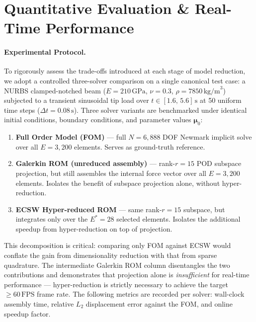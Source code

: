 \newpage

\section{Quantitative Evaluation \& Real-Time Performance}
\label{sec:benchmarks}


\paragraph{Experimental Protocol.}
To rigorously assess the trade-offs introduced at each stage of model reduction, we adopt a controlled three-solver comparison on a single canonical test case: a NURBS clamped-notched beam ($E = 210\,\text{GPa}$, $\nu = 0.3$, $\rho = 7850\,\text{kg/m}^3$) subjected to a transient sinusoidal tip load over $t \in [1.6,\, 5.6]\,\text{s}$ at 50 uniform time steps ($\Delta t = 0.08\,\text{s}$).
Three solver variants are benchmarked under identical initial conditions, boundary conditions, and parameter values $\boldsymbol{\mu}_0$:
\begin{enumerate}[noitemsep, leftmargin=1.5em]
    \item \textbf{Full Order Model (FOM)} — full $N = 6{,}888$ DOF Newmark implicit solve over all $E = 3{,}200$ elements. Serves as ground-truth reference.
    \item \textbf{Galerkin ROM (unreduced assembly)} — rank-$r = 15$ POD subspace projection, but still assembles the internal force vector over all $E = 3{,}200$ elements. Isolates the benefit of subspace projection alone, without hyper-reduction.
    \item \textbf{ECSW Hyper-reduced ROM} — same rank-$r = 15$ subspace, but integrates only over the $E^* = 28$ selected elements. Isolates the additional speedup from hyper-reduction on top of projection.
\end{enumerate}
This decomposition is critical: comparing only FOM against ECSW would conflate the gain from dimensionality reduction with that from sparse quadrature. The intermediate Galerkin ROM column disentangles the two contributions and demonstrates that projection alone is \emph{insufficient} for real-time performance — hyper-reduction is strictly necessary to achieve the target $\ge 60\,\text{FPS}$ frame rate. The following metrics are recorded per solver: wall-clock assembly time, relative $L_2$ displacement error against the FOM, and online speedup factor.



